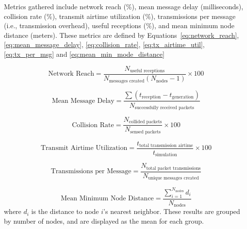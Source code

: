 \documentclass[11pt]{article}
\begin{document}
Metrics gathered include network reach (\%), mean message delay (milliseconds), collision rate (\%), transmit airtime utilization (\%), transmissions per message (i.e.,  transmission overhead), useful receptions (\%), and mean minimum node distance (meters). These metrics are defined by Equations~\eqref{eq:network_reach}, \eqref{eq:mean_message_delay}, \eqref{eq:collision_rate}, \eqref{eq:tx_airtime_util}, \eqref{eq:tx_per_msg} and \eqref{eq:mean_min_mode_distance}

\begin{equation}
    \text{Network Reach} =
    \frac{N_{\text{useful receptions}}}
    {N_{\text{messages created}}(N_{\text{nodes}} - 1)}
    \times 100
    \label{eq:network_reach}
\end{equation}

\begin{equation}
    \text{Mean Message Delay} =
    \frac{\sum (t_{\text{reception}} - t_{\text{generation}})}
    {N_{\text{successfully received packets}}}
    \label{eq:mean_message_delay}
\end{equation}

\begin{equation}
    \text{Collision Rate} =
    \frac{N_{\text{collided packets}}}
    {N_{\text{sensed packets}}}
    \times 100
    \label{eq:collision_rate}
\end{equation}

\begin{equation}
    \text{Transmit Airtime Utilization} =
    \frac{t_{\text{total transmission airtime}}}
    {t_{\text{simulation}}}
    \times 100
    \label{eq:tx_airtime_util}
\end{equation}

\begin{equation}
    \text{Transmissions per Message} =
    \frac{N_{\text{total packet transmissions}}}
    {N_{\text{unique messages created}}}
    \label{eq:tx_per_msg}
\end{equation}

\begin{equation}
    \text{Mean Minimum Node Distance} =
    \frac{\sum_{i=1}^{N_{\text{nodes}}} d_i}
    {N_{\text{nodes}}}
    \label{eq:mean_min_mode_distance}
\end{equation}
where $d_i$ is the distance to node $i$'s nearest neighbor. These results are grouped by number of nodes, and are displayed as the mean for each group.
\end{document}
